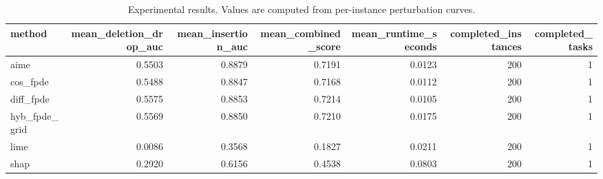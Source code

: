 \begin{table}[t]
\caption{Experimental results. Values are computed from per-instance perturbation curves.}
\label{tab:main_results_computed}
\centering
\begin{tabular}{lrrrrrr}
\toprule
method & mean\_deletion\_drop\_auc & mean\_insertion\_auc & mean\_combined\_score & mean\_runtime\_seconds & completed\_instances & completed\_tasks \\
\midrule
aime & 0.5503 & 0.8879 & 0.7191 & 0.0123 & 200 & 1 \\
cos\_fpde & 0.5488 & 0.8847 & 0.7168 & 0.0112 & 200 & 1 \\
diff\_fpde & 0.5575 & 0.8853 & 0.7214 & 0.0105 & 200 & 1 \\
hyb\_fpde\_grid & 0.5569 & 0.8850 & 0.7210 & 0.0175 & 200 & 1 \\
lime & 0.0086 & 0.3568 & 0.1827 & 0.0211 & 200 & 1 \\
shap & 0.2920 & 0.6156 & 0.4538 & 0.0803 & 200 & 1 \\
\bottomrule
\end{tabular}

\end{table}
